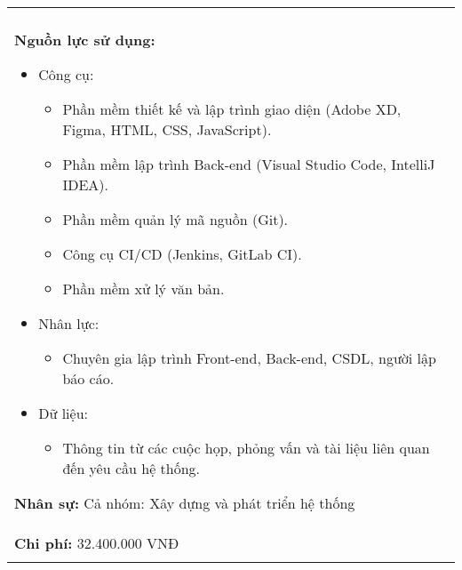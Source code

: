 \begin{longtable}{|p{\textwidth}|}
\begin{minipage}{\textwidth}
        \noindent\textbf{Thời gian thực hiện:} \\

        \noindent\textbf{Nguồn lực sử dụng:}
        \begin{itemize}
            \item Công cụ:
                  \begin{itemize}
                      \item Phần mềm thiết kế và lập trình giao diện (Adobe XD, Figma, HTML, CSS, JavaScript).
                      \item Phần mềm lập trình Back-end (Visual Studio Code, IntelliJ IDEA).
                      \item Phần mềm quản lý mã nguồn (Git).
                      \item Công cụ CI/CD (Jenkins, GitLab CI).
                      \item Phần mềm xử lý văn bản.
                  \end{itemize}
            \item Nhân lực:
                  \begin{itemize}
                      \item Chuyên gia lập trình Front-end, Back-end, CSDL, người lập báo cáo.
                  \end{itemize}
            \item Dữ liệu:
                  \begin{itemize}
                      \item Thông tin từ các cuộc họp, phỏng vấn và tài liệu liên quan đến yêu cầu hệ thống.
                  \end{itemize}
        \end{itemize}

        \noindent\textbf{Nhân sự:} Cả nhóm: Xây dựng và phát triển hệ thống \\
        \noindent\textbf{Chi phí:} 32.400.000 VNĐ \\
    \end{minipage} \\
    \hline
\end{longtable}

